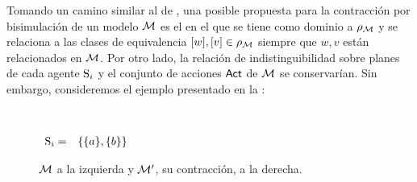 Tomando un camino similar al de \bml, una posible propuesta para la contracción por bisimulación de un modelo $\model$ 
es el \ults en el que se tiene como dominio a $\rho_\model$ y 
se relaciona a las clases de equivalencia $[w], [v] \in \rho_\model$ siempre que $w, v$ están relacionados en $\model$. 
Por otro lado, la relación de indistinguibilidad sobre planes de cada agente $\S_i$ y el conjunto de acciones $\ACT$ de $\model$ 
se conservarían. Sin embargo, consideremos el ejemplo presentado en la :

\begin{figure}[h]
    \hspace{3.4cm}
    \vspace{0.1cm}
    \begin{center}
    \hspace{1cm}
    \\
    \smallskip 
    \end{center}
    \qquad\qquad\qquad\qquad\qquad\qquad\qquad
            $\begin{array}{ll}
                
                \S_{i} = &
                    \left\{\{a\},
                \{b\} \right\}
            \end{array}$
    \caption{$\model$ a la izquierda y $\model'$, su contracción, a la derecha.}
    \label{fig:1stproposaloriginal}
\end{figure}

